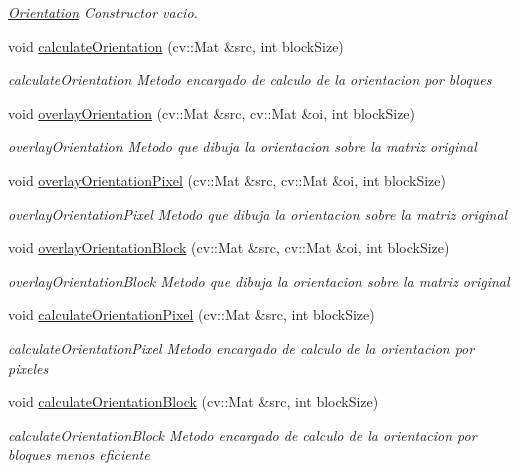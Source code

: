 \begin{DoxyCompactItemize}
\begin{DoxyCompactList}\small\item\em \hyperlink{class_orientation}{Orientation} Constructor vacio. \end{DoxyCompactList}\item 
void \hyperlink{class_orientation_a16a1fdfd5c484d5b1ecb574f033beca1}{calculate\+Orientation} (cv\+::\+Mat \&src, int block\+Size)
\begin{DoxyCompactList}\small\item\em calculate\+Orientation Metodo encargado de calculo de la orientacion por bloques \end{DoxyCompactList}\item 
void \hyperlink{class_orientation_ae7596eaf11b2e9c622a5df1ac9433257}{overlay\+Orientation} (cv\+::\+Mat \&src, cv\+::\+Mat \&oi, int block\+Size)
\begin{DoxyCompactList}\small\item\em overlay\+Orientation Metodo que dibuja la orientacion sobre la matriz original \end{DoxyCompactList}\item 
void \hyperlink{class_orientation_a0496e614c6a189d19ce9cc4577e6fc08}{overlay\+Orientation\+Pixel} (cv\+::\+Mat \&src, cv\+::\+Mat \&oi, int block\+Size)
\begin{DoxyCompactList}\small\item\em overlay\+Orientation\+Pixel Metodo que dibuja la orientacion sobre la matriz original \end{DoxyCompactList}\item 
void \hyperlink{class_orientation_af60f0c95c27fadd864c533c9effd648b}{overlay\+Orientation\+Block} (cv\+::\+Mat \&src, cv\+::\+Mat \&oi, int block\+Size)
\begin{DoxyCompactList}\small\item\em overlay\+Orientation\+Block Metodo que dibuja la orientacion sobre la matriz original \end{DoxyCompactList}\item 
void \hyperlink{class_orientation_afbed70e624322d718d685390d9631b31}{calculate\+Orientation\+Pixel} (cv\+::\+Mat \&src, int block\+Size)
\begin{DoxyCompactList}\small\item\em calculate\+Orientation\+Pixel Metodo encargado de calculo de la orientacion por pixeles \end{DoxyCompactList}\item 
void \hyperlink{class_orientation_aeefb88e6e17f4ee98d469dcd3375ab6c}{calculate\+Orientation\+Block} (cv\+::\+Mat \&src, int block\+Size)
\begin{DoxyCompactList}\small\item\em calculate\+Orientation\+Block Metodo encargado de calculo de la orientacion por bloques menos eficiente \end{DoxyCompactList}\end{DoxyCompactItemize}

